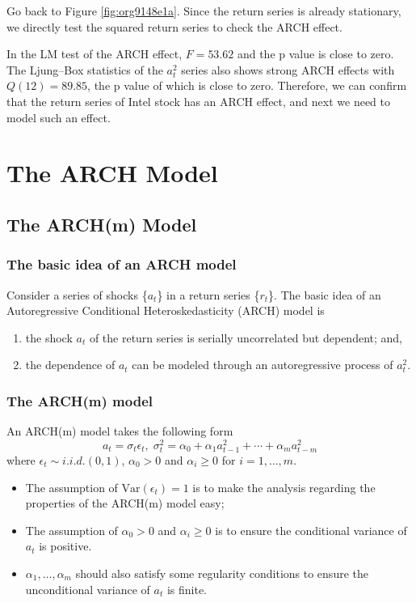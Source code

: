 \documentclass[a4paper,11pt]{article}
\newcommand{\var}{\mathrm{Var}}
\begin{document}
Go back to Figure \ref{fig:org9148e1a}. Since the return series is
already stationary, we directly test the squared return series to
check the ARCH effect.

In the LM test of the ARCH effect, \(F = 53.62\) and the p value is
close to zero. The Ljung–Box statistics of the \(a^2_t\) series also
shows strong ARCH effects with \(Q(12) = 89.85\), the p value of which is
close to zero. Therefore, we can confirm that the return series of
Intel stock has an ARCH effect, and next we need to model such an
effect.


\section{The ARCH Model}
\label{sec:orgf2213c9}

\subsection{The ARCH(m) Model}
\label{sec:org4faa154}

\subsubsection{The basic idea of an ARCH model}
\label{sec:orgeac3a3b}

Consider a series of shocks \{\(a_t\)\} in a return series \{\(r_t\)\}. The
basic idea of an Autoregressive Conditional Heteroskedasticity (ARCH)
model is
\begin{enumerate}
\item the shock \(a_t\) of the return series is serially uncorrelated but
dependent; and,
\item the dependence of \(a_t\) can be modeled through an autoregressive
process of \(a^2_t\).
\end{enumerate}

\subsubsection{The ARCH(m) model}
\label{sec:org0e4e2d2}

An ARCH(m) model takes the following form
\begin{equation}
\label{eq:archm}
a_t = \sigma_t \epsilon_t,\; \sigma^2_t = \alpha_0 + \alpha_1 a^2_{t-1} + \cdots + \alpha_m a^2_{t-m}
\end{equation}
where \(\epsilon_t \sim i.i.d.(0, 1)\), \(\alpha_0 > 0\) and \(\alpha_i
\geq 0\) for \(i=1, \ldots, m\).
\begin{itemize}
\item The assumption of \(\var(\epsilon_t)=1\) is to make the analysis
regarding the properties of the ARCH(m) model easy;
\item The assumption of \(\alpha_0 > 0\) and \(\alpha_i \geq 0\) is to ensure
the conditional variance of \(a_t\) is positive.
\item \(\alpha_1, \ldots, \alpha_m\) should also satisfy some regularity
conditions to ensure the unconditional variance of \(a_t\) is finite.
\end{itemize}
\end{document}
